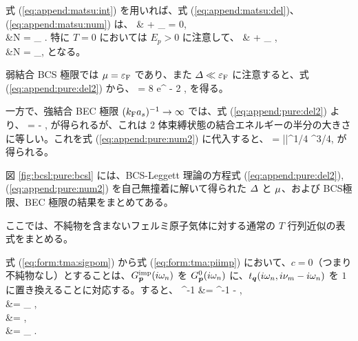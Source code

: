 式 (\ref{eq:append:matsu:int}) を用いれば、式 (\ref{eq:append:matsu:del})、(\ref{eq:append:matsu:num}) は、
\beq
& + \sum_{\bp}  = 0,\label{eq:append:pure:del}\\
&N = \sum_{\bp} .\label{eq:append:pure:num}
\eeq
特に $T=0$ においては $E_p>0$ に注意して、
\beq
& + \sum_{\bp} ,\label{eq:append:pure:del2}\\
&N = \sum_{\bp},\label{eq:append:pure:num2}
\eeq
となる。

弱結合 BCS 極限では $\mu=\varepsilon_{\text{F}}$ であり、また $\varDelta\ll \varepsilon_{\text{F}}$ に注意すると、式 (\ref{eq:append:pure:del2}) から、
\beq
\varDelta = 8 e^{\frac{\pi}{2 \askf} - 2} \eqf, \label{eq:append:pure:limitbcs}
\eeq
を得る。

一方で、強結合 BEC 極限 $(k_{\text{F}} a_s)^{-1} \to \infty$ では、式 (\ref{eq:append:pure:del2}) より、
\beq
\cpt = -  \eqf, \label{eq:append:pure:limitbec-cpt}
\eeq
が得られるが、これは 2 体束縛状態の結合エネルギーの半分の大きさに等しい。これを式 (\ref{eq:append:pure:num2}) に代入すると、
\beq
\del =  |\cpt|^{1/4} \eqf^{3/4}, \label{eq:append:pure:limitbec-del}
\eeq
が得られる。

図 \ref{fig:bcsl:pure:bcsl} には、BCS-Leggett 理論の方程式 (\ref{eq:append:pure:del2}), (\ref{eq:append:pure:num2}) を自己無撞着に解いて得られた $\varDelta$ と $\mu$、および BCS極限、BEC 極限の結果をまとめてある。


 \label{sec:append:pure:tma}
 
ここでは、不純物を含まないフェルミ原子気体に対する通常の $T$ 行列近似の表式をまとめる。

式 (\ref{eq:form:tma:sigpom}) から式 (\ref{eq:form:tma:piimp}) において、$c=0$（つまり不純物なし）とすることは、$G^{\text{imp}}_{\bm{p}}(i\omega_n)$ を $G^{0}_{\bm{p}}(i\omega_n)$ に、$t_{\bm{q}}(i\omega_n,i\nu_m-i\omega_n)$ を $1$ に置き換えることに対応する。すると、
\beq
\left[\gpom\right]^{-1} &= \left[ \gzrpom\right]^{-1} - \sigpom,\label{eq:append:tma:g}\\
\sigpom &=  \sumn \sum_{\bq} \gamqnu \gzrqnu,\label{eq:append:tma:sig}\\
\gamqnu &= ,\label{eq:append:tma:gam}\\
\piqnu &=  \sumn \sum_{\bp} \gzrpom \gzrqnu.\label{eq:append:tma:pi}
\eeq

